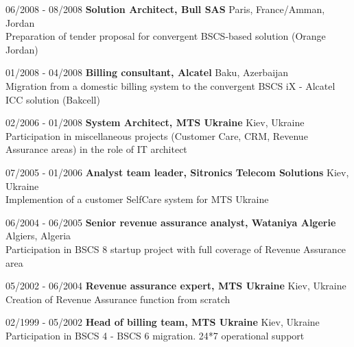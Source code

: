 \documentclass[10pt,a4paper]{extbook}
\begin{document}
\par\vspace{5mm}
06/2008 - 08/2008 \hspace{10mm} \textbf{Solution Architect, Bull SAS} \hfill Paris, France/Amman, Jordan \\
Preparation of tender proposal for convergent BSCS-based solution (Orange Jordan)
	
\par\vspace{5mm}
01/2008 - 04/2008 \hspace{10mm} \textbf{Billing consultant, Alcatel} \hfill Baku, Azerbaijan \\
Migration from a domestic billing system to the convergent BSCS iX - Alcatel ICC solution (Bakcell)
	
\par\vspace{5mm}
02/2006 - 01/2008 \hspace{10mm} \textbf{System Architect, MTS Ukraine} \hfill Kiev, Ukraine \\
Participation in miscellaneous projects (Customer Care, CRM, Revenue Assurance areas) in the role of IT architect
	
\par\vspace{5mm}
07/2005 - 01/2006 \hspace{10mm} \textbf{Analyst team leader, Sitronics Telecom Solutions} \hfill Kiev, Ukraine \\
Implemention of a customer SelfCare system for MTS Ukraine
	
\par\vspace{5mm}
06/2004 - 06/2005 \hspace{10mm} \textbf{Senior revenue assurance analyst, Wataniya Algerie} \hfill Algiers, Algeria \\ 
Participation in BSCS 8 startup project with full coverage of Revenue Assurance area
	
\par\vspace{5mm}
05/2002 - 06/2004 \hspace{10mm} \textbf{Revenue assurance expert, MTS Ukraine} \hfill Kiev, Ukraine \\
Creation of Revenue Assurance function from scratch

\par\vspace{5mm}
02/1999 - 05/2002 \hspace{10mm} \textbf{Head of billing team, MTS Ukraine} \hfill Kiev, Ukraine \\
Participation in BSCS 4 - BSCS 6 migration. 24*7 operational support
\end{document}
